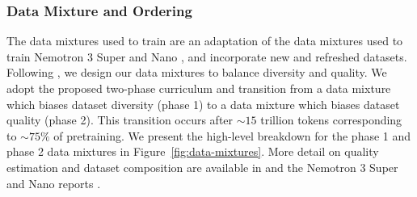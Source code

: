 






\subsubsection{Data Mixture and Ordering}

The data mixtures used to train \ourmodel are an adaptation of the data mixtures used to train Nemotron 3 Super and Nano \citep{nvidia2025nemotron3nanoopen, nvidia2026nemotron3superopen}, and incorporate new and refreshed datasets. Following \citet{feng2024maximizedataspotentialenhancing}, we design our data mixtures to balance diversity and quality. We adopt the proposed two-phase curriculum and transition from a data mixture which biases dataset diversity (phase 1) to a data mixture which biases dataset quality (phase 2). This transition occurs after ${\sim}15$ trillion tokens corresponding to ${\sim}75\%$ of pretraining. We present the high-level breakdown for the phase 1 and phase 2 data mixtures in Figure~\ref{fig:data-mixtures}. More detail on quality estimation and dataset composition are available in \citet{feng2024maximizedataspotentialenhancing} and the Nemotron 3 Super and Nano reports \citep{nvidia2025nemotron3nanoopen,nvidia2026nemotron3superopen}.

